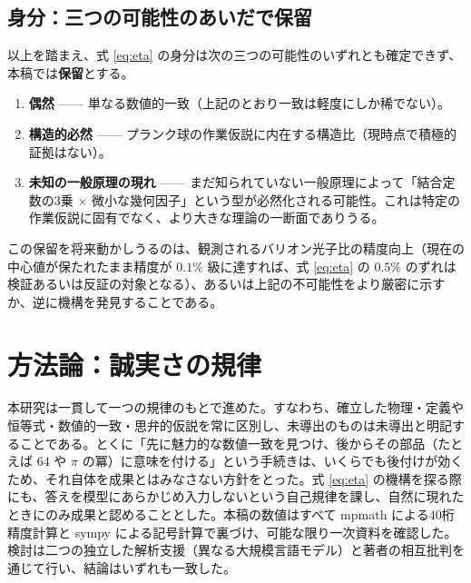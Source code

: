 \documentclass[11pt,a4paper]{article}
\begin{document}
\subsection{身分：三つの可能性のあいだで保留}
以上を踏まえ、式 \eqref{eq:eta} の身分は次の三つの可能性のいずれとも確定できず、本稿では\textbf{保留}とする。
\begin{enumerate}[leftmargin=1.6em]
\item \textbf{偶然} —— 単なる数値的一致（上記のとおり一致は軽度にしか稀でない）。
\item \textbf{構造的必然} —— プランク球の作業仮説に内在する構造比（現時点で積極的証拠はない）。
\item \textbf{未知の一般原理の現れ} —— まだ知られていない一般原理によって「結合定数の3乗 $\times$ 微小な幾何因子」という型が必然化される可能性。これは特定の作業仮説に固有でなく、より大きな理論の一断面でありうる。
\end{enumerate}
この保留を将来動かしうるのは、観測されるバリオン光子比の精度向上（現在の中心値が保たれたまま精度が $0.1\%$ 級に達すれば、式 \eqref{eq:eta} の $0.5\%$ のずれは検証あるいは反証の対象となる）、あるいは上記の不可能性をより厳密に示すか、逆に機構を発見することである。

\section{方法論：誠実さの規律}
本研究は一貫して一つの規律のもとで進めた。すなわち、確立した物理・定義や恒等式・数値的一致・思弁的仮説を常に区別し、未導出のものは未導出と明記することである。とくに「先に魅力的な数値一致を見つけ、後からその部品（たとえば $64$ や $\pi$ の冪）に意味を付ける」という手続きは、いくらでも後付けが効くため、それ自体を成果とはみなさない方針をとった。式 \eqref{eq:eta} の機構を探る際にも、答えを模型にあらかじめ入力しないという自己規律を課し、自然に現れたときにのみ成果と認めることとした。本稿の数値はすべて mpmath による40桁精度計算と sympy による記号計算で裏づけ、可能な限り一次資料を確認した。検討は二つの独立した解析支援（異なる大規模言語モデル）と著者の相互批判を通じて行い、結論はいずれも一致した。
\end{document}
